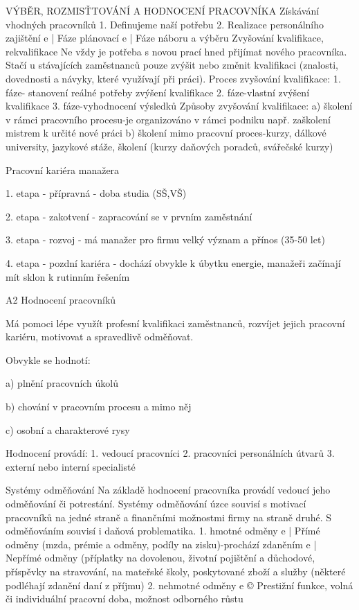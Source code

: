VÝBĚR, ROZMISŤTOVÁNÍ A HODNOCENÍ PRACOVNÍKA
Získávání vhodných pracovníků
1. Definujeme naší potřebu
2. Realizace personálního zajištění
e | Fáze plánovací
e | Fáze náboru a výběru
Zvyšování kvalifikace, rekvalifikace
Ne vždy je potřeba s novou prací hned přijímat nového pracovníka. Stačí u stávajících
zaměstnanců pouze zvýšit nebo změnit kvalifikaci (znalosti, dovednosti a návyky, které
využívají při práci).
Proces zvyšování kvalifikace:
1. fáze- stanovení reálné potřeby zvýšení kvalifikace
2. fáze-vlastní zvýšení kvalifikace
3. fáze-vyhodnocení výsledků
Způsoby zvyšování kvalifikace:
a) školení v rámci pracovního procesu-je organizováno v rámci podniku
např. zaškolení mistrem k určité nové práci
b) školení mimo pracovní proces-kurzy, dálkové university, jazykové stáže,
školení (kurzy daňových poradců, svářečské kurzy)

Pracovní kariéra manažera

1. etapa - přípravná - doba studia (SŠ,VŠ)

2. etapa - zakotvení - zapracování se v prvním zaměstnání

3. etapa - rozvoj - má manažer pro firmu velký význam a přínos (35-50 let)

4. etapa - pozdní kariéra - dochází obvykle k úbytku energie, manažeři začínají mít sklon
k rutinním řešením

A2
\newpage
Hodnocení pracovníků

Má pomoci lépe využít profesní kvalifikaci zaměstnanců, rozvíjet jejich pracovní kariéru,
motivovat a spravedlivě odměňovat.

Obvykle se hodnotí:

a) plnění pracovních úkolů

b) chování v pracovním procesu a mimo něj

c) osobní a charakterové rysy

Hodnocení provádí:
1. vedoucí pracovníci
2. pracovníci personálních útvarů
3. externí nebo interní specialisté

Systémy odměňování
Na základě hodnocení pracovníka provádí vedoucí jeho odměňování či potrestání. Systémy
odměňování úzce souvisí s motivací pracovníků na jedné straně a finančními možnostmi
firmy na straně druhé. S odměňováním souvisí i daňová problematika.
1. hmotné odměny
e | Přímé odměny (mzda, prémie a odměny, podíly na zisku)-prochází zdaněním
e | Nepřímé odměny (příplatky na dovolenou, životní pojištění a důchodové, příspěvky na
stravování, na mateřské školy, poskytované zboží a služby
(některé podléhají zdanění daní z příjmu)
2. nehmotné odměny
e © Prestižní funkce, volná či individuální pracovní doba, možnost odborného růstu


